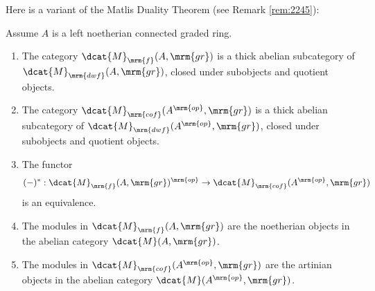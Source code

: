 Here is a variant of the Matlis Duality Theorem (see Remark \ref{rem:2245}):

\begin{thm} \label{thm:4045} 
Assume $A$ is a left noetherian connected graded ring. 
\begin{enumerate}
\item The category $\dcat{M}_{\mrm{f}}(A, \mrm{gr})$ is a thick abelian 
subcategory of $\dcat{M}_{\mrm{dwf}}(A, \mrm{gr})$, 
closed under subobjects and quotient objects. 

\item The category $\dcat{M}_{\mrm{cof}}(A^{\mrm{op}}, \mrm{gr})$
is a thick abelian subcategory of 
$\dcat{M}_{\mrm{dwf}}(A^{\mrm{op}}, \mrm{gr})$, 
closed under subobjects and quotient objects. 

\item The functor 
\[ (-)^* : \dcat{M}_{\mrm{f}}(A, \mrm{gr})^{\mrm{op}} \to 
\dcat{M}_{\mrm{cof}}(A^{\mrm{op}}, \mrm{gr}) \]
is an equivalence. 

\item The modules in $\dcat{M}_{\mrm{f}}(A, \mrm{gr})$ are the noetherian 
objects in the abelian category $\dcat{M}(A, \mrm{gr})$.

\item The modules in $\dcat{M}_{\mrm{cof}}(A^{\mrm{op}}, \mrm{gr})$ are the 
artinian objects in the abelian category $\dcat{M}(A^{\mrm{op}}, \mrm{gr})$.
\end{enumerate}
\end{thm}

